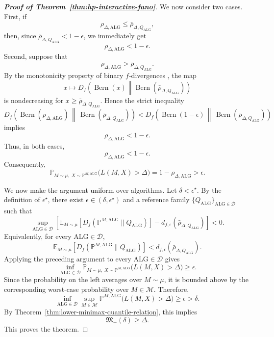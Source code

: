 \documentclass[journal]{IEEEtran}
\newcommand{\Bern}{\operatorname{Bern}}
\newcommand{\ALG}{\mathrm{ALG}}
\begin{document}
\begin{proof}[\textbf{Proof of Theorem~\ref{thm:hp-interactive-fano}}]
We now consider two cases. First, if
\[
\rho_{\Delta,\ALG}\le \bar\rho_{\Delta,Q_\ALG},
\]
then, since \(\bar\rho_{\Delta,Q_\ALG}<1-\epsilon\), we immediately get
\[
\rho_{\Delta,\ALG}<1-\epsilon.
\]
Second, suppose that
\[
\rho_{\Delta,\ALG}> \bar\rho_{\Delta,Q_\ALG}.
\]
By the monotonicity property of binary \(f\)-divergences
\cite[Lemma~C.1]{chen2024assouad}, the map
\[
x\mapsto
D_f\!\left(\Bern(x)\middle\|
\Bern(\bar\rho_{\Delta,Q_\ALG})\right)
\]
is nondecreasing for \(x\ge \bar\rho_{\Delta,Q_\ALG}\). Hence the strict
inequality
\[
D_f\!\left(
\Bern(\rho_{\Delta,\ALG})
\,\middle\|\,
\Bern(\bar\rho_{\Delta,Q_\ALG})
\right)
<
D_f\!\left(
\Bern(1-\epsilon)
\,\middle\|\,
\Bern(\bar\rho_{\Delta,Q_\ALG})
\right)
\]
implies
\[
\rho_{\Delta,\ALG}<1-\epsilon.
\]
Thus, in both cases,
\[
\rho_{\Delta,\ALG}<1-\epsilon.
\]
Consequently,
\[
\mathbb P_{M\sim\mu,\;X\sim \mathbb P^{M,\ALG}}
\bigl(L(M,X)>\Delta\bigr)
=
1-\rho_{\Delta,\ALG}
>
\epsilon.
\]

We now make the argument uniform over algorithms. Let
\(\delta<\epsilon^\star\). By the definition of \(\epsilon^\star\), there
exist \(\epsilon\in(\delta,\epsilon^\star)\) and a reference family
\(\{Q_\ALG\}_{\ALG\in\mathcal D}\) such that
\[
\sup_{\ALG\in\mathcal D}
\left[
\mathbb E_{M\sim\mu}
\left[
D_f\!\left(\mathbb P^{M,\ALG}\|Q_\ALG\right)
\right]
-
d_{f,\epsilon}(\bar\rho_{\Delta,Q_\ALG})
\right]
<0.
\]
Equivalently, for every \(\ALG\in\mathcal D\),
\[
\mathbb E_{M\sim\mu}
\left[
D_f\!\left(\mathbb P^{M,\ALG}\|Q_\ALG\right)
\right]
<
d_{f,\epsilon}(\bar\rho_{\Delta,Q_\ALG}).
\]
Applying the preceding argument to every \(\ALG\in\mathcal D\) gives
\[
\inf_{\ALG\in\mathcal D}
\mathbb P_{M\sim\mu,\;X\sim \mathbb P^{M,\ALG}}
\bigl(L(M,X)>\Delta\bigr)
\ge
\epsilon.
\]
Since the probability on the left averages over \(M\sim\mu\), it is bounded
above by the corresponding worst-case probability over \(M\in\mathcal M\).
Therefore,
\[
\inf_{\ALG\in\mathcal D}
\sup_{M\in\mathcal M}
\mathbb P^{M,\ALG}
\bigl(L(M,X)>\Delta\bigr)
\ge
\epsilon
>
\delta.
\]
By Theorem~\ref{thm:lower-minimax-quantile-relation}, this implies
\[
\mathfrak M_-(\delta)\ge \Delta.
\]
This proves the theorem.
\end{proof}
\end{document}
